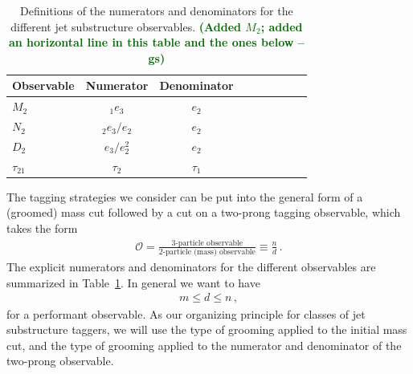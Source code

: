 \documentclass[11pt,letterpaper]{article}
\DeclareRobustCommand{\Tab}[1]{Table~\ref{#1}}
\newcommand{\ecfnobeta}[1]{e_{#1}}
\newcommand{\ecfvarnobeta}[2]{{_{#1}e_{#2}}}
\newcommand{\gs}[1]{\textbf{\textcolor{darkgreen}{(#1 --gs)}}}
\begin{document}
\begin{table}
\begin{center}
\begin{tabular}{| l | c | c |c |c|c|c |c|r| }
  \hline                       
  Observable &  Numerator & Denominator \\
  \hline
  $M_2$ &   $\ecfvarnobeta{1}{3}$ & $ \ecfnobeta{2}$ \\
  $N_2$ &   $\ecfvarnobeta{2}{3} / \ecfnobeta{2} $ & $ \ecfnobeta{2}$ \\
  $D_2$ &   $\ecfnobeta{3} / \ecfnobeta{2}^2 $ & $ \ecfnobeta{2}$ \\
  $\tau_{21}$ &   $\tau_2$ & $\tau_1$ \\
  \hline  
\end{tabular}
\end{center}
\caption{
Definitions of the numerators and denominators for the different jet
substructure observables. \gs{Added $M_2$; added an horizontal line in this table
  and the ones below}
}
\label{tab:dn}
\end{table}


The tagging strategies we consider can be put into the general form of a (groomed) mass cut followed by a cut on a two-prong tagging observable, which takes the form
\begin{align}
\mathcal{O}=\frac{\text{3-particle observable}}{\text{2-particle (mass) observable}} \equiv \frac{n}{d}\,.
\end{align}
The explicit numerators and denominators for the different observables are summarized in \Tab{tab:dn}. In general we want to have
\begin{align}
m \leq d \leq n\,,
\end{align}
for a performant observable.
As our organizing principle for classes of  jet substructure taggers, we will use the type of grooming applied to the initial mass cut, and the type of grooming applied to the numerator and denominator of the two-prong observable.
\end{document}
